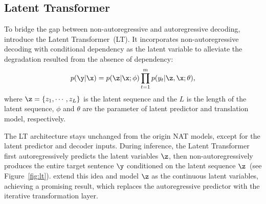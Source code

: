 \subsection{Latent Transformer}\label{ss:latent-nat}
To bridge the gap between non-autoregressive and autoregressive decoding, \citet{lt} introduce the Latent Transformer~(LT).
It incorporates non-autoregressive decoding with conditional dependency as the latent variable to alleviate the degradation resulted from the absence of dependency:
\begin{equation}
\label{eqn:lt}
    p(\y|\x)= p(\z|\x;\phi) \prod_{t=1}^{m} p(y_{t}|\z,\x; \theta),
\end{equation}
where $\z=\{z_1,\cdots,z_L\}$ is the latent sequence and the $L$ is the length of the latent sequence, $\phi$ and $\theta$ are the parameter of latent predictor and translation model, respectively. 

The LT architecture stays unchanged from the origin NAT models, except for the latent predictor and decoder inputs. 
During inference, the Latent Transformer first autoregressively predicts the latent variables $\z$, then non-autoregressively produces the entire target sentence $\y$ conditioned on the latent sequence $\z$~(see Figure~\ref{fig:lt}). \citet{flowseq,lv_nar} extend this idea and model $\z$ as the continuous latent variables, achieving a promising result, which replaces the autoregressive predictor with the iterative transformation layer.

